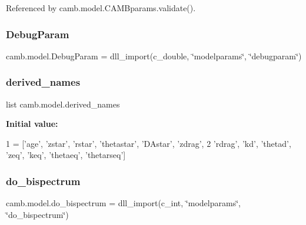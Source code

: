 Referenced by camb.\+model.\+C\+A\+M\+Bparams.\+validate().

\mbox{\label{namespacecamb_1_1model_a6eafa5f0e3403059f0e189ec00af87e2}} 
\subsubsection{\texorpdfstring{Debug\+Param}{DebugParam}}
{\footnotesize\ttfamily camb.\+model.\+Debug\+Param = dll\+\_\+import(c\+\_\+double, \char`\"{}modelparams\char`\"{}, \char`\"{}debugparam\char`\"{})}

\mbox{\label{namespacecamb_1_1model_a9b00248528fe3ce4ddd0796aa2f788db}} 
\subsubsection{\texorpdfstring{derived\+\_\+names}{derived\_names}}
{\footnotesize\ttfamily list camb.\+model.\+derived\+\_\+names}

{\bfseries Initial value\+:}
\begin{DoxyCode}
1 =  [\textcolor{stringliteral}{'age'}, \textcolor{stringliteral}{'zstar'}, \textcolor{stringliteral}{'rstar'}, \textcolor{stringliteral}{'thetastar'}, \textcolor{stringliteral}{'DAstar'}, \textcolor{stringliteral}{'zdrag'},
2                  \textcolor{stringliteral}{'rdrag'}, \textcolor{stringliteral}{'kd'}, \textcolor{stringliteral}{'thetad'}, \textcolor{stringliteral}{'zeq'}, \textcolor{stringliteral}{'keq'}, \textcolor{stringliteral}{'thetaeq'}, \textcolor{stringliteral}{'thetarseq'}]
\end{DoxyCode}
\mbox{\label{namespacecamb_1_1model_aabe9302a4b4ff9ae24ec7f62e659a0b5}} 
\subsubsection{\texorpdfstring{do\+\_\+bispectrum}{do\_bispectrum}}
{\footnotesize\ttfamily camb.\+model.\+do\+\_\+bispectrum = dll\+\_\+import(c\+\_\+int, \char`\"{}modelparams\char`\"{}, \char`\"{}do\+\_\+bispectrum\char`\"{})}

